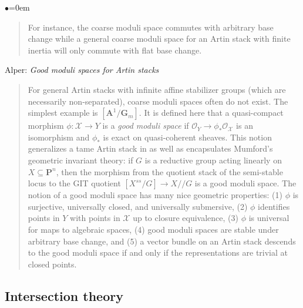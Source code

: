 \begin{list}{$\bullet$}{\leftmargin=0em}
\begin{quote}
For instance, the coarse moduli space commutes with arbitrary base change while
a general coarse moduli space for an Artin stack with finite inertia will only
commute with flat base change.
\end{quote}
\smallskip
\item Alper: \emph{Good moduli spaces for Artin stacks} \cite{alper_good}
\begin{quote}
For general Artin stacks with infinite affine stabilizer groups (which are
necessarily non-separated), coarse moduli spaces often do not exist. The
simplest example is $[\mathbf{A}^1 / \mathbf{G}_m]$. It is defined here that a
quasi-compact
morphism $\phi: \mathcal{X} \to Y$ is a \emph{good moduli space} if
$\mathcal{O}_Y \to \phi_*
\mathcal{O}_\mathcal{X}$ is an isomorphism and $\phi_*$ is exact on
quasi-coherent sheaves.
This notion generalizes a tame Artin stack in \cite{tame} as well as
encapsulates Mumford's geometric invariant theory: if $G$ is a reductive group
acting linearly on $X \subseteq \mathbf{P}^n$, then the morphism from the
quotient
stack of the semi-stable locus to the GIT quotient $[X^{ss}/G] \to X//G$ is a
good moduli space. The notion of a good moduli space has many nice geometric
properties: (1) $\phi$ is surjective, universally closed, and universally
submersive, (2) $\phi$ identifies points in $Y$ with points in $\mathcal{X}$ up
to
closure equivalence, (3) $\phi$ is universal for maps to algebraic spaces, (4)
good moduli spaces are stable under arbitrary base change, and (5) a vector
bundle on an Artin stack descends to the good moduli space if and only if the
representations are trivial at closed points.
\end{quote}
\end{list}


\subsection{Intersection theory}
\label{subsection-intersection-theory}


